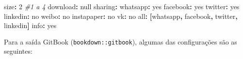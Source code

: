 \documentclass[
]{book}
\newenvironment{Shaded}{\begin{snugshade}}{\end{snugshade}}
\newcommand{\AttributeTok}[1]{\textcolor[rgb]{0.77,0.63,0.00}{#1}}
\newcommand{\CharTok}[1]{\textcolor[rgb]{0.31,0.60,0.02}{#1}}
\newcommand{\CommentTok}[1]{\textcolor[rgb]{0.56,0.35,0.01}{\textit{#1}}}
\newcommand{\DecValTok}[1]{\textcolor[rgb]{0.00,0.00,0.81}{#1}}
\newcommand{\FunctionTok}[1]{\textcolor[rgb]{0.00,0.00,0.00}{#1}}
\newcommand{\KeywordTok}[1]{\textcolor[rgb]{0.13,0.29,0.53}{\textbf{#1}}}
\newcommand{\StringTok}[1]{\textcolor[rgb]{0.31,0.60,0.02}{#1}}
\begin{document}
\begin{Shaded}
\begin{Highlighting}[]
\AttributeTok{      }\FunctionTok{size}\KeywordTok{:}\AttributeTok{ }\DecValTok{2}\CommentTok{ \#1 a 4}
\AttributeTok{    }\FunctionTok{download}\KeywordTok{:}\AttributeTok{ }\CharTok{null}
\AttributeTok{    }\FunctionTok{sharing}\KeywordTok{:}
\AttributeTok{      }\FunctionTok{whatsapp}\KeywordTok{:}\AttributeTok{ }\CharTok{yes}
\AttributeTok{      }\FunctionTok{facebook}\KeywordTok{:}\AttributeTok{ }\CharTok{yes}
\AttributeTok{      }\FunctionTok{twitter}\KeywordTok{:}\AttributeTok{ }\CharTok{yes}
\AttributeTok{      }\FunctionTok{linkedin}\KeywordTok{:}\AttributeTok{ }\CharTok{no}
\AttributeTok{      }\FunctionTok{weibo}\KeywordTok{:}\AttributeTok{ }\CharTok{no}
\AttributeTok{      }\FunctionTok{instapaper}\KeywordTok{:}\AttributeTok{ }\CharTok{no}
\AttributeTok{      }\FunctionTok{vk}\KeywordTok{:}\AttributeTok{ }\CharTok{no}
\AttributeTok{      }\FunctionTok{all}\KeywordTok{:}\AttributeTok{ }\KeywordTok{[}\StringTok{\textquotesingle{}whatsapp\textquotesingle{}}\KeywordTok{,}\AttributeTok{ }\StringTok{\textquotesingle{}facebook\textquotesingle{}}\KeywordTok{,}\AttributeTok{ }\StringTok{\textquotesingle{}twitter\textquotesingle{}}\KeywordTok{,}\AttributeTok{ }\StringTok{\textquotesingle{}linkedin\textquotesingle{}}\KeywordTok{]}
\AttributeTok{    }\FunctionTok{info}\KeywordTok{:}\AttributeTok{ }\CharTok{yes}
\end{Highlighting}
\end{Shaded}

Para a saída GitBook (\texttt{bookdown::gitbook}), algumas das configurações são as seguintes:
\end{document}
